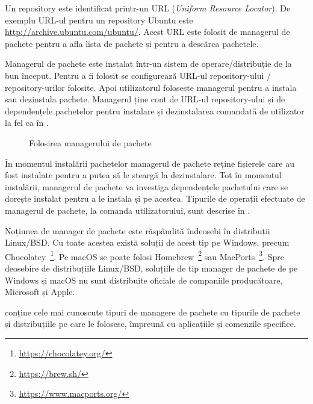 Un repository este identificat printr-un URL (\textit{Uniform Resource Locator}). De exemplu URL-ul pentru un repository Ubuntu este \url{http://archive.ubuntu.com/ubuntu/}. Acest URL este folosit de managerul de pachete pentru a afla lista de pachete și pentru a descărca pachetele.

Managerul de pachete este instalat într-un sistem de operare/distribuție de la bun început. Pentru a fi folosit se configurează URL-ul repository-ului / repository-urilor folosite. Apoi utilizatorul folosește managerul pentru a instala sau dezinstala pachete. Managerul ține cont de URL-ul repository-ului și de dependențele pachetelor pentru instalare și dezinstalarea comandată de utilizator la fel ca în .

\begin{figure}[htbp]
  \centering
  \def\svgwidth{\columnwidth}
  
  \caption{Folosirea managerului de pachete}
  \label{fig:package:manager}
\end{figure}

În momentul instalării pachetelor managerul de pachete reține fișierele care au fost instalate pentru a putea să le șteargă la dezinstalare. Tot în momentul instalării, managerul de pachete va investiga dependențele pachetului care se dorește instalat pentru a le instala și pe acestea. Tipurile de operații efectuate de managerul de pachete, la comanda utilizatorului, sunt descrise în .

Noțiunea de manager de pachete este răspândită îndeosebi în distribuții Linux/BSD. Cu toate acestea există soluții de acest tip pe Windows, precum Chocolatey~\footnote{\url{https://chocolatey.org/}}. Pe macOS se poate folosi Homebrew~\footnote{\url{https://brew.sh/}} sau MacPorts~\footnote{\url{https://www.macports.org/}}. Spre deosebire de distribuțiile Linux/BSD, soluțiile de tip manager de pachete de pe Windows și macOS nu sunt distribuite oficiale de companiile producătoare, Microsoft și Apple.

 conține cele mai cunoscute tipuri de managere de pachete cu tipurile de pachete și distribuțiile pe care le folosesc, împreună cu aplicațiile și comenzile specifice.

